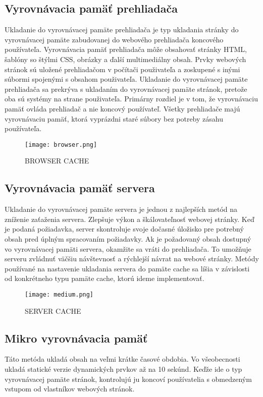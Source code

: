 \documentclass[10pt,oneside,slovak,a4paper]{article}
\begin{document}
\subsection{Vyrovnávacia pamäť prehliadača}
\quad Ukladanie do vyrovnávacej pamäte prehliadača je typ ukladania stránky do vyrovnávacej pamäte zabudovanej do webového prehliadača koncového používateľa. Vyrovnávacia pamäť prehliadača môže obsahovať stránky HTML, šablóny so štýlmi CSS\cite{MAN}, obrázky a ďalší multimediálny obsah. Prvky webových stránok sú uložené prehliadačom v počítači použivateľa a zoskupené s inými súbormi spojenými s obsahom použivateľa.
Ukladanie do vyrovnávacej pamäte prehliadača sa prekrýva s ukladaním do vyrovnávacej pamäte stránok, pretože oba sú systémy na strane použivateľa. Primárny rozdiel je v tom, že vyrovnávaciu pamäť ovláda prehliadač a nie koncový používateľ. Všetky prehliadače majú vyrovnávaciu pamäť, ktorá vyprázdni staré súbory bez potreby zásahu používateľa.


\begin{figure}[H]
\centering
\texttt{[image: browser.png]}
\caption{BROWSER CACHE\cite{OCEAN}}
\label{fig:diag}
\end{figure}

\subsection{Vyrovnávacia pamäť servera}
\quad 

Ukladanie do vyrovnávacej pamäte servera je jednou z najlepších metód na zníženie zaťaženia servera.\cite{MAN} Zlepšuje výkon a škálovateľnosť webovej stránky. Keď je podaná požiadavka, server skontroluje svoje dočasné úložisko pre potrebný obsah pred úplným spracovaním požiadavky. Ak je požadovaný obsah dostupný vo vyrovnávacej pamäti servera, okamžite sa vráti do prehliadača. To umožňuje  serveru zvládnuť väčšiu návštevnosť a rýchlejší návrat na webové stránky.
Metódy používané na nastavenie ukladania servera do pamäte cache sa líšia v závislosti od konkrétneho typu pamäte cache, ktorú ideme implementovať.


\begin{figure}[H]
\centering
\texttt{[image: medium.png]}
\caption{SERVER CACHE\cite{MEDIUM}}
\label{fig:diag}
\end{figure}


\subsection{Mikro vyrovnávacia pamäť}
\quad Táto metóda ukladá obsah na veľmi krátke časové obdobia. Vo všeobecnosti ukladá statické verzie dynamických prvkov až na 10 sekúnd\cite {MAN}. Keďže ide o typ vyrovnávacej pamäte stránok, kontrolujú ju koncoví používatelia s obmedzeným vstupom od vlastníkov webových stránok.
\end{document}
